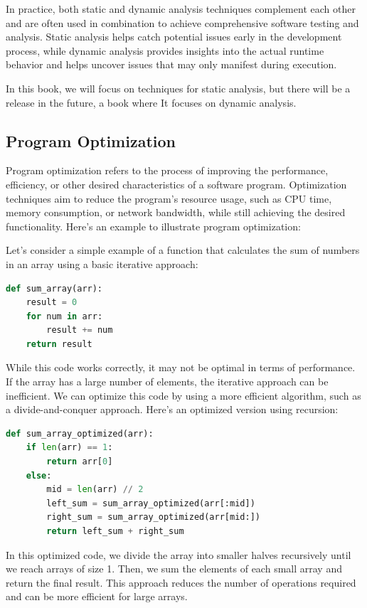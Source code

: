 In practice, both static and dynamic analysis techniques complement each other and are often used in combination to achieve comprehensive software testing and analysis. Static analysis helps catch potential issues early in the development process, while dynamic analysis provides insights into the actual runtime behavior and helps uncover issues that may only manifest during execution. 

In this book, we will focus on techniques for static analysis, but there will be a release in the future, a book where It focuses on dynamic analysis. 

\subsection{Program Optimization}

Program optimization refers to the process of improving the performance, efficiency, or other desired characteristics of a software program. Optimization techniques aim to reduce the program's resource usage, such as CPU time, memory consumption, or network bandwidth, while still achieving the desired functionality. Here's an example to illustrate program optimization:

Let's consider a simple example of a function that calculates the sum of numbers in an array using a basic iterative approach:

\begin{lstlisting}[language=Python]
def sum_array(arr):
    result = 0
    for num in arr:
        result += num
    return result
\end{lstlisting}

While this code works correctly, it may not be optimal in terms of performance. If the array has a large number of elements, the iterative approach can be inefficient. We can optimize this code by using a more efficient algorithm, such as a divide-and-conquer approach. Here's an optimized version using recursion:

\begin{lstlisting}[language=Python]
def sum_array_optimized(arr):
    if len(arr) == 1:
        return arr[0]
    else:
        mid = len(arr) // 2
        left_sum = sum_array_optimized(arr[:mid])
        right_sum = sum_array_optimized(arr[mid:])
        return left_sum + right_sum
\end{lstlisting}

In this optimized code, we divide the array into smaller halves recursively until we reach arrays of size 1. Then, we sum the elements of each small array and return the final result. This approach reduces the number of operations required and can be more efficient for large arrays.

